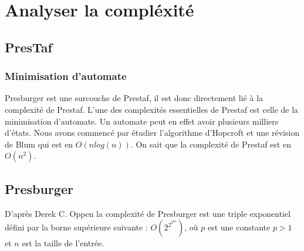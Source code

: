 \section{Analyser la compléxité}

\subsection{PresTaf}

\subsubsection{Minimisation d'automate}

Presburger est une surcouche de Prestaf, il est donc directement lié à la complexité de Prestaf. L'une des complexités essentielles de Prestaf est celle de la minimisation d'automate. Un automate peut en effet avoir plusieurs milliers d'états. Nous avons commencé par étudier l'algorithme d'Hopcroft et une révision de Blum qui est en $O(nlog(n))$. On sait que la complexité de Prestaf est en $O(n^2)$.

\subsection{Presburger}

D'après Derek C. Oppen\cite{oppen1978222pn} la complexité de Presburger est une triple exponentiel défini par la borne supérieure suivante : $O(2^{2^{2^{pn}}})$, où $p$ est une constante $p > 1$ et $n$ est la taille de l'entrée.
